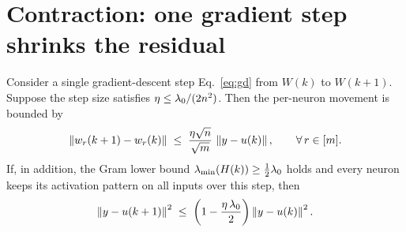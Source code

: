 \section{Contraction: one gradient step shrinks the residual}\label{sec:contraction}

\begin{lemma}\label{lem:contraction}
Consider a single gradient-descent step Eq.~\eqref{eq:gd} from $W(k)$ to $W(k+1)$. Suppose
the step size satisfies $\eta \le \lambda_{0} / (2 n^2)$. Then the per-neuron movement is bounded by
\begin{align}\label{eq:move}
\left\|  w_r(k+1) - w_r(k)  \right\| \;\le\; \frac{\eta \sqrt{n}}{\sqrt{m}}\, \left\|  y - u(k)  \right\|,
\qquad \forall\, r \in [m].
\end{align}
If, in addition, the Gram lower bound $\lambda_{\min}(H(k)) \ge \tfrac12\lambda_{0}$ holds and every neuron
keeps its activation pattern on all inputs over this step, then
\begin{align}\label{eq:contract}
\left\|  y - u(k+1)  \right\|^2 \;\le\; \left( 1 - \frac{\eta\,\lambda_{0}}{2} \right) \left\|  y - u(k)  \right\|^2 .
\end{align}
\end{lemma}

